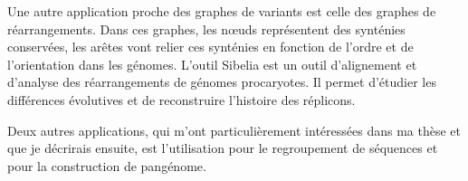 Une autre application proche des graphes de variants est celle des graphes de réarrangements. Dans ces graphes, les n\oe uds représentent des synténies conservées, les arêtes vont relier ces synténies en fonction de l'ordre et de l'orientation dans les génomes. L'outil Sibelia \cite{minkin_sibelia_2013} est un outil d'alignement et d'analyse des réarrangements de génomes procaryotes. Il permet  d'étudier les différences évolutives et de reconstruire l'histoire des réplicons.

Deux autres applications, qui m'ont particulièrement intéressées dans ma thèse et que je décrirais ensuite, est l'utilisation pour le regroupement de séquences et pour la construction de pangénome. 
